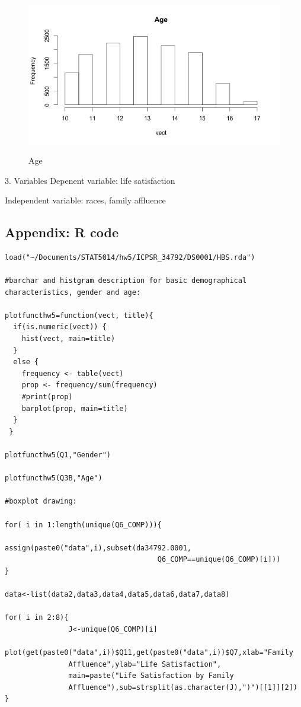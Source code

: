 \documentclass[12pt]{article}
\begin{document}
\begin{figure}[hptb]
	\centering
{\includegraphics[scale=0.45]{agepic.png}} \;
\caption{Age}
	\label{fig:img}
\end{figure}

3. Variables
Depenent variable: life satisfaction

Independent variable: races,   family affluence



\subsection*{Appendix: R code}
\begin{verbatim}
load("~/Documents/STAT5014/hw5/ICPSR_34792/DS0001/HBS.rda")

#barchar and histgram description for basic demographical characteristics, gender and age:

plotfuncthw5=function(vect, title){
  if(is.numeric(vect)) {
    hist(vect, main=title)
  }
  else {
    frequency <- table(vect)
    prop <- frequency/sum(frequency)
    #print(prop)
    barplot(prop, main=title)
  }
 }

plotfuncthw5(Q1,"Gender")

plotfuncthw5(Q3B,"Age")

#boxplot drawing:

for( i in 1:length(unique(Q6_COMP))){
                                    assign(paste0("data",i),subset(da34792.0001,
                                    Q6_COMP==unique(Q6_COMP)[i]))
}

data<-list(data2,data3,data4,data5,data6,data7,data8)

for( i in 2:8){
               J<-unique(Q6_COMP)[i]
               plot(get(paste0("data",i))$Q11,get(paste0("data",i))$Q7,xlab="Family        
               Affluence",ylab="Life Satisfaction",
               main=paste("Life Satisfaction by Family 
               Affluence"),sub=strsplit(as.character(J),")")[[1]][2])
}
\end{verbatim}
\end{document}
